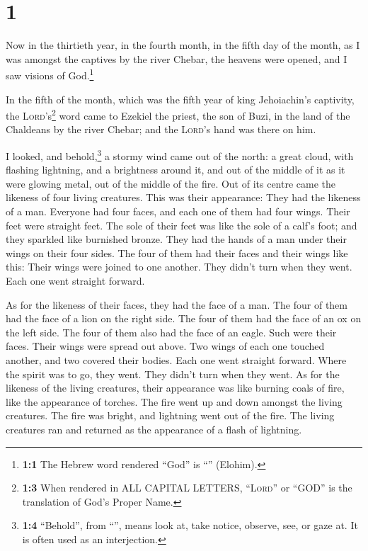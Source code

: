 \hypertarget{section}{%
\section{1}\label{section}}

 Now in the thirtieth year, in the fourth month, in the
fifth day of the month, as I was amongst the captives by the river
Chebar, the heavens were opened, and I saw visions of God.\footnote{\textbf{1:1}
  The Hebrew word rendered ``God'' is ``'' (Elohim).}

 In the fifth of the month, which was the fifth year of
king Jehoiachin's captivity,  the
\textsc{Lord}'s\footnote{\textbf{1:3} When rendered in ALL CAPITAL
  LETTERS, ``\textsc{Lord}'' or ``GOD'' is the translation of God's
  Proper Name.} word came to Ezekiel the priest, the son of Buzi, in the
land of the Chaldeans by the river Chebar; and the \textsc{Lord}'s hand
was there on him.

 I looked, and behold,\footnote{\textbf{1:4} ``Behold'',
  from ``'', means look at, take notice, observe, see, or
  gaze at. It is often used as an interjection.} a stormy wind came out
of the north: a great cloud, with flashing lightning, and a brightness
around it, and out of the middle of it as it were glowing metal, out of
the middle of the fire.  Out of its centre came the
likeness of four living creatures. This was their appearance: They had
the likeness of a man.  Everyone had four faces, and each
one of them had four wings.  Their feet were straight
feet. The sole of their feet was like the sole of a calf's foot; and
they sparkled like burnished bronze.  They had the hands
of a man under their wings on their four sides. The four of them had
their faces and their wings like this:  Their wings were
joined to one another. They didn't turn when they went. Each one went
straight forward.

 As for the likeness of their faces, they had the face of
a man. The four of them had the face of a lion on the right side. The
four of them had the face of an ox on the left side. The four of them
also had the face of an eagle.  Such were their faces.
Their wings were spread out above. Two wings of each one touched
another, and two covered their bodies.  Each one went
straight forward. Where the spirit was to go, they went. They didn't
turn when they went.  As for the likeness of the living
creatures, their appearance was like burning coals of fire, like the
appearance of torches. The fire went up and down amongst the living
creatures. The fire was bright, and lightning went out of the fire.
 The living creatures ran and returned as the appearance
of a flash of lightning.

